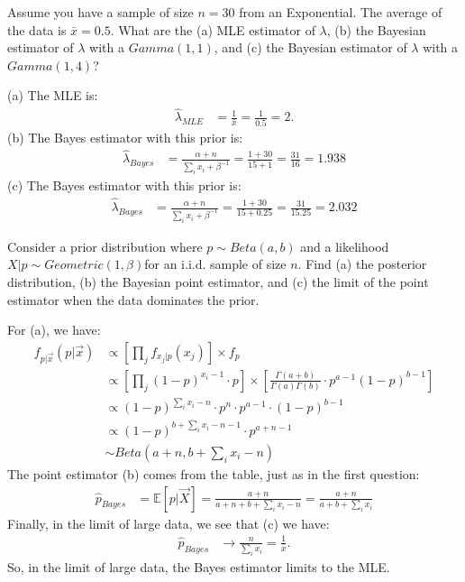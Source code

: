 
Assume you have a sample of size $n = 30$ from an Exponential. The 
average of the data is $\bar{x} = 0.5$. What are the (a) MLE estimator of $\lambda$,
(b) the Bayesian estimator of $\lambda$ with a $Gamma(1, 1)$, and (c) the
Bayesian estimator of $\lambda$ with a $Gamma(1, 4)$?


(a) The MLE is:
\begin{align*}
\hat{\lambda}_{MLE} &= \frac{1}{\bar{x}} = \frac{1}{0.5} = 2.
\end{align*}
(b) The Bayes estimator with this prior is:
\begin{align*}
\hat{\lambda}_{Bayes} &= \frac{\alpha + n}{\sum_i x_i + \beta^{-1}} = \frac{1 + 30}{15 + 1} = \frac{31}{16} = 1.938
\end{align*}
(c) The Bayes estimator with this prior is:
\begin{align*}
\hat{\lambda}_{Bayes} &= \frac{\alpha + n}{\sum_i x_i + \beta^{-1}} = \frac{1 + 30}{15 + 0.25} = \frac{31}{15.25} = 2.032
\end{align*}


Consider a prior distribution where $p \sim Beta(a, b)$ and a 
likelihood $X|p \sim Geometric(1, \beta)$for an i.i.d. sample of size $n$.
Find (a) the posterior distribution, (b) the Bayesian point estimator, and (c) the
limit of the point estimator when the data dominates the prior.



For (a), we have:
\begin{align*}
f_{p | \vec{x}}(p | \vec{x}) 
&\propto \left[ \prod_j f_{x_j| p }(x_j) \right] \times f_{p} \\
&\propto \left[ \prod_j (1 - p)^{x_i - 1} \cdot p \right] \times \left[ \frac{\Gamma(a + b)}{\Gamma(a)\Gamma(b)} \cdot p^{a -1} (1-p)^{b - 1} \right] \\
&\propto (1 - p)^{\sum_i x_i - n} \cdot p^{n} \cdot p^{a -1} \cdot (1-p)^{b - 1} \\
&\propto (1 - p)^{b + \sum_i x_i - n - 1} \cdot p^{a + n - 1} \\
&\sim Beta(a + n, b + \sum_i x_i - n)
\end{align*}
The point estimator (b) comes from the table, just as in the first question:
\begin{align*}
\hat{p}_{Bayes} &= \mathbb{E}[ p | \vec{X} ] = \frac{a + n}{a + n + b + \sum_i x_i - n} = \frac{a + n}{a + b + \sum_i x_i}
\end{align*}
Finally, in the limit of large data, we see that (c) we have:
\begin{align*}
\hat{p}_{Bayes} &\rightarrow \frac{n}{\sum_i x_i} = \frac{1}{\bar{x}}.
\end{align*}
So, in the limit of large data, the Bayes estimator limits to the MLE.

